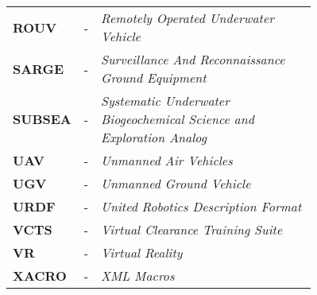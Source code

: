 \begin{table}[!hbt]
\begin{tabular}{l p{0.01\linewidth} p{0.75\linewidth}}
		\textbf{ROUV} & - & \textit{Remotely Operated Underwater Vehicle} \\
		\textbf{SARGE} & - & \textit{Surveillance And Reconnaissance Ground Equipment} \\
		\textbf{SUBSEA} & - & \textit{Systematic Underwater Biogeochemical Science and Exploration Analog} \\
		\textbf{UAV} & - & \textit{Unmanned Air Vehicles} \\
		\textbf{UGV} & - & \textit{Unmanned Ground Vehicle} \\
		\textbf{URDF} & - & \textit{United Robotics Description Format} \\
		\textbf{VCTS} & - & \textit{Virtual Clearance Training Suite} \\
		\textbf{VR} & - & \textit{Virtual Reality} \\
		\textbf{XACRO} & - & \textit{XML Macros}
	\end{tabular}
\end{table}